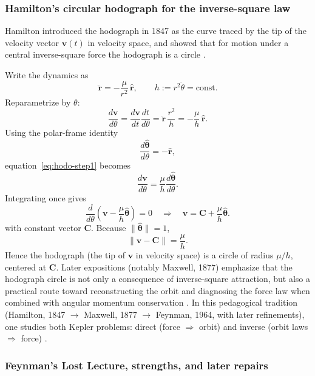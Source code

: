 \subsubsection{Hamilton's circular hodograph for the inverse-square law}

Hamilton introduced the hodograph in 1847 as the curve traced by the tip of the velocity vector $\mathbf v(t)$ in velocity space, and showed that for motion under a central inverse-square force the hodograph is a circle \cite{hamilton1847hodograph}.

Write the dynamics as
\[
  \ddot{\mathbf r}=-\frac{\mu}{r^2}\,\hat{\mathbf r},
  \qquad
  h:=r^2\dot\theta=\text{const}.
\]
Reparametrize by $\theta$:
\begin{equation}
  \frac{d\mathbf v}{d\theta}
  =
  \frac{d\mathbf v}{dt}\frac{dt}{d\theta}
  =
  \ddot{\mathbf r}\,\frac{r^2}{h}
  =
  -\frac{\mu}{h}\,\hat{\mathbf r}.
\label{eq:hodo-step1}
\end{equation}
Using the polar-frame identity
\[
  \frac{d\hat{\boldsymbol\theta}}{d\theta}=-\hat{\mathbf r},
\]
equation~\eqref{eq:hodo-step1} becomes
\begin{equation}
  \frac{d\mathbf v}{d\theta}
  =
  \frac{\mu}{h}\frac{d\hat{\boldsymbol\theta}}{d\theta}.
\label{eq:hodo-step2}
\end{equation}
Integrating once gives
\begin{equation}
  \frac{d}{d\theta}\!\left(\mathbf v-\frac{\mu}{h}\hat{\boldsymbol\theta}\right)=0
  \quad\Longrightarrow\quad
  \mathbf v=\mathbf C+\frac{\mu}{h}\hat{\boldsymbol\theta}.
\label{eq:hodo-step3}
\end{equation}
with constant vector $\mathbf C$.
Because $\|\hat{\boldsymbol\theta}\|=1$,
\[
  \|\mathbf v-\mathbf C\|=\frac{\mu}{h}.
\]
Hence the hodograph (the tip of $\mathbf v$ in velocity space) is a circle of radius $\mu/h$, centered at $\mathbf C$.
Later expositions (notably Maxwell, 1877) emphasize that the hodograph circle is not only a consequence of inverse-square attraction, but also a practical route toward reconstructing the orbit and diagnosing the force law when combined with angular momentum conservation \cite{maxwell1877mattermotion,derbes2001reinventing}. In this pedagogical tradition (Hamilton, 1847 $\to$ Maxwell, 1877 $\to$ Feynman, 1964, with later refinements), one studies both Kepler problems: direct (force $\Rightarrow$ orbit) and inverse (orbit laws $\Rightarrow$ force) \cite{derbes2001reinventing}.

\subsubsection{Feynman's Lost Lecture, strengths, and later repairs}

